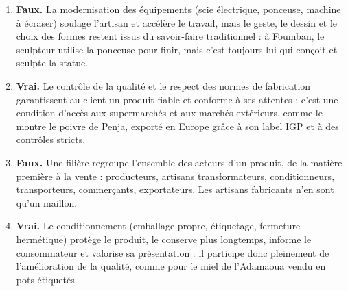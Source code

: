\documentclass[11pt]{article}
\begin{document}
\begin{corrige}
\begin{enumerate}
\item \textbf{Faux.} La modernisation des équipements (scie électrique, ponceuse, machine à écraser) soulage l'artisan et accélère le travail, mais le geste, le dessin et le choix des formes restent issus du savoir-faire traditionnel : à Foumban, le sculpteur utilise la ponceuse pour finir, mais c'est toujours lui qui conçoit et sculpte la statue.

\item \textbf{Vrai.} Le contrôle de la qualité et le respect des normes de fabrication garantissent au client un produit fiable et conforme à ses attentes ; c'est une condition d'accès aux supermarchés et aux marchés extérieurs, comme le montre le poivre de Penja, exporté en Europe grâce à son label IGP et à des contrôles stricts.

\item \textbf{Faux.} Une filière regroupe l'ensemble des acteurs d'un produit, de la matière première à la vente : producteurs, artisans transformateurs, conditionneurs, transporteurs, commerçants, exportateurs. Les artisans fabricants n'en sont qu'un maillon.

\item \textbf{Vrai.} Le conditionnement (emballage propre, étiquetage, fermeture hermétique) protège le produit, le conserve plus longtemps, informe le consommateur et valorise sa présentation : il participe donc pleinement de l'amélioration de la qualité, comme pour le miel de l'Adamaoua vendu en pots étiquetés.
\end{enumerate}
\end{corrige}
\end{document}
